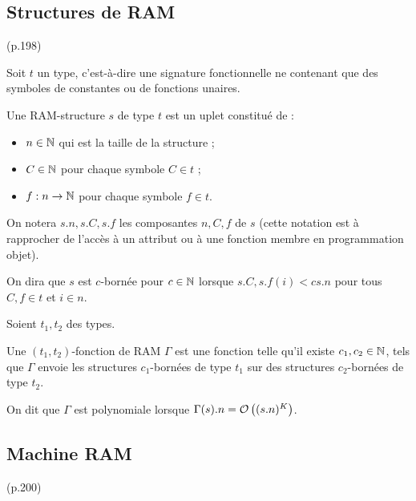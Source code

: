 \documentclass{report}
\begin{document}
		\subsection{Structures de RAM} (p.198)
			\label{sec:RAM_data_structures}

		\begin{definition}
			\label{def:RAM_data_structures}
			Soit $t$ un type, c'est-à-dire une signature fonctionnelle ne contenant que des symboles de constantes ou de fonctions unaires.
			
			Une RAM-structure $s$ de type $t$ est un uplet constitué de :
			\begin{itemize}[itemsep=-1mm]
				\item 	$n \in \mathbb{N}$ qui est la taille de la structure ;
				\item 	$C \in \mathbb{N}$ pour chaque symbole $C \in t$ ;
				\item 	$f : n \to \mathbb{N}$ pour chaque symbole $f \in t$.
			\end{itemize}
			
			On notera $s.n, s.C, s.f$ les composantes $n, C, f$ de $s$ (cette notation est à rapprocher de l'accès à un attribut ou à une fonction membre en programmation objet).
			
			On dira que $s$ est $c$-bornée pour $c\in\mathbb{N}$ lorsque $s.C, s.f(i) < c s.n$ pour tous $C, f \in t$ et $i \in n$.
		\end{definition}
	
	
		\begin{definition}
			\label{def:fonction_de_RAM}
			Soient $t_1, t_2$ des types. 
			
			Une $(t_1, t_2)$-fonction de RAM $\Gamma$ est une fonction telle qu'il existe $c_1, c_2 \in \mathbb{N}$, tels que $\Gamma$ envoie les structures $c_1$-bornées de type $t_1$ sur des structures $c_2$-bornées de type $t_2$\footnotemark.
			
			
			On dit que $\Gamma$ est polynomiale lorsque $\Gamma(s).n = \mathcal{O}\left( (s.n)^K \right)$.
			
		\end{definition}
	
	
	
		\subsection{Machine RAM} (p.200)
			\label{subsec:machine_RAM}
		
\end{document}
